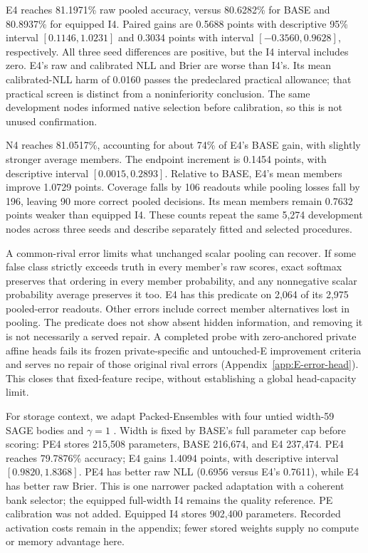 E4 reaches 81.1971\% raw pooled accuracy, versus 80.6282\% for BASE and 80.8937\% for equipped I4. Paired gains are 0.5688 points with descriptive 95\% interval $[0.1146,1.0231]$ and 0.3034 points with interval $[-0.3560,0.9628]$, respectively. All three seed differences are positive, but the I4 interval includes zero. E4's raw and calibrated NLL and Brier are worse than I4's. Its mean calibrated-NLL harm of 0.0160 passes the predeclared practical allowance; that practical screen is distinct from a noninferiority conclusion. The same development nodes informed native selection before calibration, so this is not unused confirmation.

N4 reaches 81.0517\%, accounting for about 74\% of E4's BASE gain, with slightly stronger average members. The endpoint increment is 0.1454 points, with descriptive interval $[0.0015,0.2893]$. Relative to BASE, E4's mean members improve 1.0729 points. Coverage falls by 106 readouts while pooling losses fall by 196, leaving 90 more correct pooled decisions. Its mean members remain 0.7632 points weaker than equipped I4. These counts repeat the same 5,274 development nodes across three seeds and describe separately fitted and selected procedures.

A common-rival error limits what unchanged scalar pooling can recover. If some false class strictly exceeds truth in every member's raw scores, exact softmax preserves that ordering in every member probability, and any nonnegative scalar probability average preserves it too. E4 has this predicate on 2,064 of its 2,975 pooled-error readouts. Other errors include correct member alternatives lost in pooling. The predicate does not show absent hidden information, and removing it is not necessarily a served repair. A completed probe with zero-anchored private affine heads fails its frozen private-specific and untouched-E improvement criteria and serves no repair of those original rival errors (Appendix~\ref{app:E-error-head}). This closes that fixed-feature recipe, without establishing a global head-capacity limit.

For storage context, we adapt Packed-Ensembles with four untied width-59 SAGE bodies and $\gamma=1$ \citep{laurent2023packed}. Width is fixed by BASE's full parameter cap before scoring: PE4 stores 215,508 parameters, BASE 216,674, and E4 237,474. PE4 reaches 79.7876\% accuracy; E4 gains 1.4094 points, with descriptive interval $[0.9820,1.8368]$. PE4 has better raw NLL (0.6956 versus E4's 0.7611), while E4 has better raw Brier. This is one narrower packed adaptation with a coherent bank selector; the equipped full-width I4 remains the quality reference. PE calibration was not added. Equipped I4 stores 902,400 parameters. Recorded activation costs remain in the appendix; fewer stored weights supply no compute or memory advantage here.
